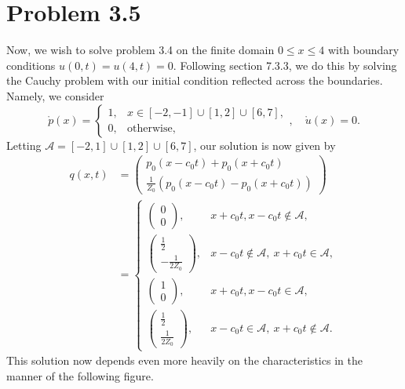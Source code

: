 \documentclass{article}
\begin{document}
\section{Problem 3.5}
Now, we wish to solve problem 3.4 on the finite domain $0\leq x\leq4$ with boundary conditions $u(0,t)=u(4,t)=0$. Following section 7.3.3, we do this by solving the Cauchy problem with our initial condition reflected across the boundaries. Namely, we consider
\[
\mathring p(x)=\begin{cases}
	1,&x\in[-2,-1]\cup[1,2]\cup[6,7],\\
	0,&\text{otherwise},
\end{cases},\quad\mathring u(x)=0.
\]
Letting $\mathcal A=[-2,1]\cup[1,2]\cup[6,7]$, our solution is now given by
\begin{align*}
	q(x,t)&=\begin{pmatrix}
		p_0(x-c_0t)+p_0(x+c_0t)\\
		\frac{1}{Z_0}(p_0(x-c_0t)-p_0(x+c_0t))
	\end{pmatrix}\\&=
	\begin{cases}
		\begin{pmatrix}
			0\\0
		\end{pmatrix}, &x+c_0t,x-c_0t\notin\mathcal{A},\\
		\begin{pmatrix}
			\frac{1}{2}\\-\frac{1}{2Z_0}
		\end{pmatrix}, &x-c_0t\notin\mathcal{A},~ x+c_0t\in\mathcal{A},\\
		\begin{pmatrix}
			1\\0
		\end{pmatrix}, &x+c_0t,x-c_0t\in\mathcal{A},\\
		\begin{pmatrix}
			\frac{1}{2}\\\frac{1}{2Z_0}
		\end{pmatrix}, &x-c_0t\in\mathcal{A},~ x+c_0t\notin\mathcal{A}.
	\end{cases}
\end{align*}
This solution now depends even more heavily on the characteristics in the manner of the following figure.\\
\end{document}
